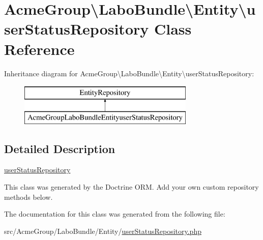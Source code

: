\hypertarget{class_acme_group_1_1_labo_bundle_1_1_entity_1_1user_status_repository}{\section{Acme\+Group\textbackslash{}Labo\+Bundle\textbackslash{}Entity\textbackslash{}user\+Status\+Repository Class Reference}
\label{class_acme_group_1_1_labo_bundle_1_1_entity_1_1user_status_repository}
}
Inheritance diagram for Acme\+Group\textbackslash{}Labo\+Bundle\textbackslash{}Entity\textbackslash{}user\+Status\+Repository\+:\begin{figure}[H]
\begin{center}
\leavevmode
\includegraphics[height=2.000000cm]{class_acme_group_1_1_labo_bundle_1_1_entity_1_1user_status_repository}
\end{center}
\end{figure}


\subsection{Detailed Description}
\hyperlink{class_acme_group_1_1_labo_bundle_1_1_entity_1_1user_status_repository}{user\+Status\+Repository}

This class was generated by the Doctrine O\+R\+M. Add your own custom repository methods below. 

The documentation for this class was generated from the following file\+:\begin{DoxyCompactItemize}
\item 
src/\+Acme\+Group/\+Labo\+Bundle/\+Entity/\hyperlink{user_status_repository_8php}{user\+Status\+Repository.\+php}\end{DoxyCompactItemize}
